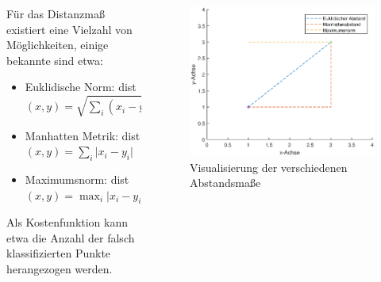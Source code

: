 \begin{frame}
    \begin{columns}[T]
        \begin{column}{0.49\textwidth}
        	Für das Distanzmaß existiert eine Vielzahl von Möglichkeiten, einige bekannte sind etwa:
            \begin{itemize}
				\item Euklidische Norm: dist$(x,y) = \sqrt{\sum_{i} (x_i - y_i)^2}$
				\item Manhatten Metrik: dist$(x,y) = \sum_i \vert x_i-y_i \vert$
				\item Maximumsnorm: dist$(x,y) = \max_i \vert x_i - y_i \vert$
\end{itemize}
Als Kostenfunktion kann etwa die Anzahl der falsch klassifizierten Punkte herangezogen werden.
        \end{column}
        \begin{column}{0.49\textwidth}
            \begin{figure}[hbtp]
				\centering
					\includegraphics[scale=0.4]{images/plot_distances.eps}
				\caption{Visualisierung der verschiedenen Abstandsmaße}
			\end{figure}
        \end{column}
    \end{columns}
\end{frame}
